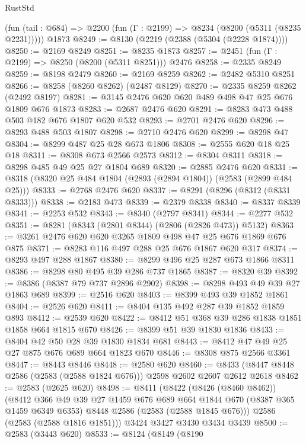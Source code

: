 \begin{lexlean}{RustStd}
\begin{coremodule}
    (fun (tail : @684) => @2200 (fun (Γ : @2199) => @8234 (@8200 (@5311 (@8235 @2231)))))
    @1873
@8249 := @8130 (@2219 (@2388 (@5304 (@2228 @1874))))
@8250 := @2169 @8249
@8251 := @8235 @1873
@8257 := @2451 (fun (Γ : @2199) => @8250 (@8200 (@5311 @8251))) @2476
@8258 := @2335 @8249
@8259 := @8198 @2479
@8260 := @2169 @8259
@8262 := @2482 @5310 @8251
@8266 := @8258 (@8260 @8262) (@2487 @8129)
@8270 := @2335 @8259 @8262 (@2492 @8197)
@8281 := @3145 @2476 @620 @620 @489 @498 @47 @25 @676 @1809 @676 @1873
@8283 := @2687 @2476 @620
@8291 := @8283 @473 @488 @503 @182 @676 @1807 @620 @532
@8293 := @2701 @2476 @620
@8296 := @8293 @488 @503 @1807
@8298 := @2710 @2476 @620
@8299 := @8298 @47
@8304 := @8299 @487 @25 @28 @673 @1806
@8308 := @2555 @620 @18 @25 @18
@8311 := @8308 @673 @2566 @2573
@8312 := @8304 @8311
@8318 := @8298 @485 @49 @25 @27 @1804 @689
@8320 := @2885 @2476 @620
@8331 := @8318 (@8320 @25 @484 @1804 (@2893 (@2894 @1804)) (@2583 (@2899 @484 @25)))
@8333 := @2768 @2476 @620
@8337 := @8291 (@8296 (@8312 (@8331 @8333)))
@8338 := @2183 @473
@8339 := @2379 @8338
@8340 := @8337 @8339
@8341 := @2253 @532
@8343 := @8340 (@2797 @8341)
@8344 := @2277 @532
@8351 := @8281 (@8343 (@2801 @8344) (@2806 (@2826 @473)) @5132)
@8363 := @3261 @2476 @620 @620 @3265 @1809 @498 @47 @25 @676 @1869 @676 @875
@8371 := @8283 @116 @497 @288 @25 @676 @1867 @620 @317
@8374 := @8293 @497 @288 @1867
@8380 := @8299 @496 @25 @287 @673 @1866 @8311
@8386 := @8298 @80 @495 @39 @286 @737 @1865
@8387 := @8320 @39
@8392 := @8386 (@8387 @79 @737 @2896 @2902)
@8398 := @8298 @493 @49 @39 @27 @1863 @689
@8399 := @2516 @620
@8403 := @8399 @493 @39 @1852 @1861
@8404 := @2526 @620
@8411 := @8404 @135 @492 @287 @39 @1852 @1859 @893
@8412 := @2539 @620
@8422 := @8412 @51 @368 @39 @286 @1838 @1851 @1858 @664 @1815 @670
@8426 := @8399 @51 @39 @1830 @1836
@8433 := @8404 @42 @50 @28 @39 @1830 @1834 @681
@8443 := @8412 @47 @49 @25 @27 @875 @676 @689 @664 @1823 @670
@8446 := @8308 @875 @2566 @3361
@8447 := @8443 @8446
@8448 := @2580 @620
@8460 := @8433 (@8447 @8448 @2586 (@2583 (@2588 @1824 @676))) @2598 @2602 @2607 @2612 @2618
@8462 := @2583 (@2625 @620)
@8498 := @8411
    (@8422
      (@8426 (@8460 @8462))
      (@8412
        @366
        @49
        @39
        @27
        @1459
        @676
        @689
        @664
        @1844
        @670
        (@8387 @365 @1459 @6349 @6353)
        @8448
        @2586
        (@2583 (@2588 @1845 @676)))
      @2586
      (@2583 (@2588 @1816 @1851)))
    @3424
    @3427
    @3430
    @3434
    @3439
@8500 := @2583 (@3443 @620)
@8533 := @8124
    (@8149
      (@8190

\end{coremodule}
\end{lexlean}
